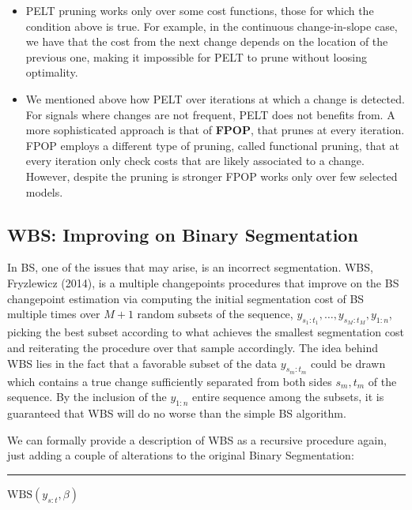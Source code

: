 \documentclass[
  letterpaper,
  DIV=11,
  numbers=noendperiod]{scrreprt}
\begin{document}
\begin{itemize}
\item
  PELT pruning works only over some cost functions, those for which the
  condition above is true. For example, in the continuous
  change-in-slope case, we have that the cost from the next change
  depends on the location of the previous one, making it impossible for
  PELT to prune without loosing optimality.
\item
  We mentioned above how PELT over iterations at which a change is
  detected. For signals where changes are not frequent, PELT does not
  benefits from. A more sophisticated approach is that of \textbf{FPOP},
  that prunes at every iteration. FPOP employs a different type of
  pruning, called functional pruning, that at every iteration only check
  costs that are likely associated to a change. However, despite the
  pruning is stronger FPOP works only over few selected models.
\end{itemize}

\subsection{WBS: Improving on Binary
Segmentation}\label{wbs-improving-on-binary-segmentation}

In BS, one of the issues that may arise, is an incorrect segmentation.
WBS, Fryzlewicz (2014), is a multiple changepoints procedures that
improve on the BS changepoint estimation via computing the initial
segmentation cost of BS multiple times over \(M + 1\) random subsets of
the sequence, \(y_{s_1:t_1}, \dots, y_{s_M:t_M}, y_{1:n}\), picking the
best subset according to what achieves the smallest segmentation cost
and reiterating the procedure over that sample accordingly. The idea
behind WBS lies in the fact that a favorable subset of the data
\(y_{s_m:t_m}\) could be drawn which contains a true change sufficiently
separated from both sides \(s_m, t_m\) of the sequence. By the inclusion
of the \(y_{1:n}\) entire sequence among the subsets, it is guaranteed
that WBS will do no worse than the simple BS algorithm.

We can formally provide a description of WBS as a recursive procedure
again, just adding a couple of alterations to the original Binary
Segmentation:

\begin{center}\rule{0.5\linewidth}{0.5pt}\end{center}

\(\text{WBS}(y_{s:t}, \beta)\)\\
\end{document}
